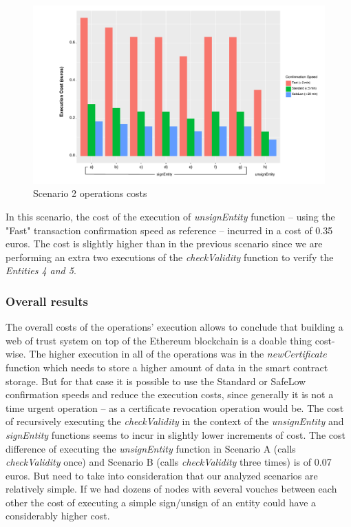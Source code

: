 \begin{figure}[htb]
  \centering
  \includegraphics[scale=0.5]{Figures/evaluation/wot-scenario2.pdf}
  \caption{Scenario 2 operations costs}
\label{fig:scenario2-operation-cost}
\end{figure}

In this scenario, the cost of the execution of \textit{unsignEntity} function – using the "Fast" transaction confirmation speed as reference – incurred in a cost of 0.35 euros.
The cost is slightly higher than in the previous scenario since we are performing an extra two executions of the \textit{checkValidity} function to verify the \textit{Entities 4 and 5}.

\subsubsection{Overall results}

The overall costs of the operations' execution allows to conclude that building a web of trust system on top of the Ethereum blockchain is a doable thing cost-wise.
The higher execution in all of the operations was in the \textit{newCertificate} function which needs to store a higher amount of data in the smart contract storage. But for that case it is possible to use the Standard or SafeLow confirmation speeds and reduce the execution costs, since generally it is not a time urgent operation – as a certificate revocation operation would be.
The cost of recursively executing the \textit{checkValidity} in the context of the \textit{unsignEntity} and \textit{signEntity} functions seems to incur in slightly lower increments of cost. The cost difference of executing the \textit{unsignEntity} function in Scenario A (calls \textit{checkValidity} once) and Scenario B (calls \textit{checkValidity} three times) is of 0.07 euros. But need to take into consideration that our analyzed scenarios are relatively simple. If we had dozens of nodes with several vouches between each other the cost of executing a simple sign/unsign of an entity could have a considerably higher cost.

